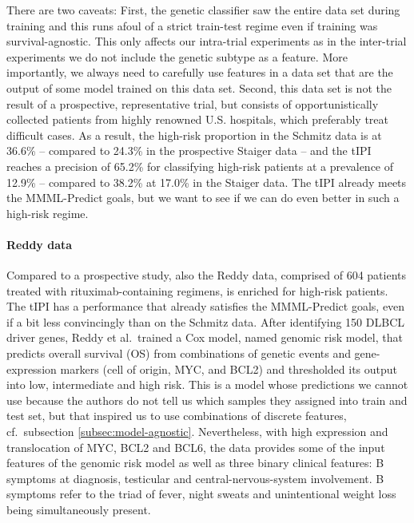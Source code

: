 There are two caveats: First, the genetic classifier saw the entire data set during training and 
this runs afoul of a strict train-test regime even if training was 
survival-agnostic. This only affects our intra-trial experiments as in the inter-trial experiments 
we do not include the genetic subtype as a feature. More importantly, we always need 
to carefully use features in a data set that are the output of some model trained on this data set. 
Second, this data set is not the result of a 
prospective, representative trial, but consists of opportunistically collected patients from highly renowned 
U.S. hospitals, which preferably treat 
difficult cases. As a result, the high-risk proportion in the Schmitz data is at \num{36.6}\% -- 
compared to \num{24.3}\% in the prospective Staiger data -- and the tIPI reaches a precision of 
\num{65.2}\% for classifying high-risk patients at a prevalence of \num{12.9}\% -- compared to 
\num{38.2}\% at \num{17.0}\% in the Staiger data. The tIPI already meets the MMML-Predict goals, 
but we want to see if we can do even better in such a high-risk regime.

\paragraph{Reddy data}

Compared to a prospective study, also the Reddy data, comprised of \num{604} patients treated with 
rituximab-containing regimens, is enriched for high-risk patients. The 
tIPI has a performance that already satisfies the MMML-Predict goals, even if a bit less 
convincingly than on the Schmitz data. After identifying \num{150} DLBCL driver genes, Reddy et al.\ 
trained a Cox model, named genomic risk model,
that predicts overall survival (OS) from combinations of genetic events and gene-expression markers 
(cell of origin, MYC, and BCL2) and thresholded its output into low, intermediate and high risk. 
This is a
model whose predictions we cannot use because the authors do not tell us which samples they assigned
into train and test set, but that inspired us to use combinations of discrete features, cf.\ 
subsection 
\ref{subsec:model-agnostic}. Nevertheless, with high expression and translocation of MYC, BCL2 and 
BCL6, the data provides some of the input features of the genomic risk model as well as three binary 
clinical features: B symptoms at diagnosis, testicular and central-nervous-system involvement. B 
symptoms refer to the triad of fever, night sweats and unintentional weight 
loss being simultaneously present.

